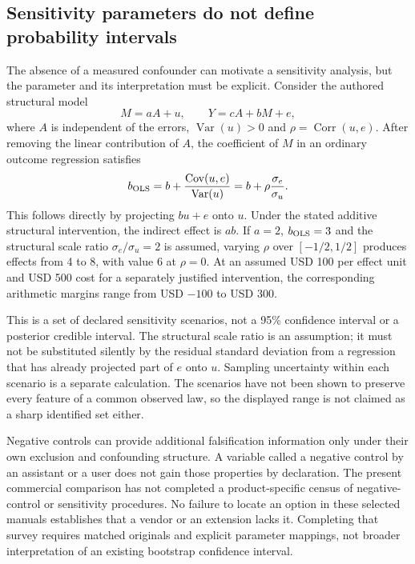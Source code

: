 \subsection{Sensitivity parameters do not define probability intervals}
\label{exec20:med-sensitivity}
The absence of a measured confounder can motivate a sensitivity analysis, but the parameter and its interpretation must be explicit. Consider the authored structural model
\begin{equation}
 M=aA+u,\qquad Y=cA+bM+e,
 \label{exec20:med-residual-law}
\end{equation}
where $A$ is independent of the errors, $\operatorname{Var}(u)>0$ and
$\rho=\operatorname{Corr}(u,e)$. After removing the linear contribution of $A$, the coefficient of $M$ in an ordinary outcome regression satisfies
\begin{equation}
 b_{\rm OLS}
   =b+\frac{\operatorname{Cov}(u,e)}{\operatorname{Var}(u)}
   =b+\rho\frac{\sigma_e}{\sigma_u}.
 \label{exec20:med-bias}
\end{equation}
This follows directly by projecting $bu+e$ onto $u$. Under the stated additive structural intervention, the indirect effect is $ab$. If $a=2$, $b_{\rm OLS}=3$ and the structural scale ratio $\sigma_e/\sigma_u=2$ is assumed, varying $\rho$ over $[-1/2,1/2]$ produces effects from 4 to 8, with value 6 at $\rho=0$. At an assumed USD 100 per effect unit and USD 500 cost for a separately justified intervention, the corresponding arithmetic margins range from USD $-100$ to USD 300.~\citep{exec20_med_reference}

This is a set of declared sensitivity scenarios, not a 95\% confidence interval or a posterior credible interval. The structural scale ratio is an assumption; it must not be substituted silently by the residual standard deviation from a regression that has already projected part of $e$ onto $u$. Sampling uncertainty within each scenario is a separate calculation. The scenarios have not been shown to preserve every feature of a common observed law, so the displayed range is not claimed as a sharp identified set either.

Negative controls can provide additional falsification information only under their own exclusion and confounding structure. A variable called a negative control by an assistant or a user does not gain those properties by declaration. The present commercial comparison has not completed a product-specific census of negative-control or sensitivity procedures. No failure to locate an option in these selected manuals establishes that a vendor or an extension lacks it. Completing that survey requires matched originals and explicit parameter mappings, not broader interpretation of an existing bootstrap confidence interval.

